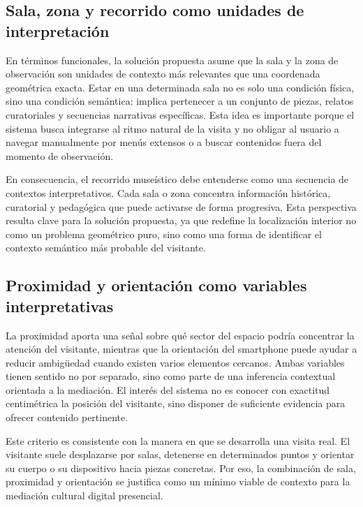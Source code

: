 \subsection{Sala, zona y recorrido como unidades de interpretaci\'on}

En t\'erminos funcionales, la solución propuesta asume que la sala y la zona de observaci\'on son unidades de contexto m\'as relevantes que una coordenada geom\'etrica exacta. Estar en una determinada sala no es solo una condici\'on f\'isica, sino una condici\'on sem\'antica: implica pertenecer a un conjunto de piezas, relatos curatoriales y secuencias narrativas espec\'ificas. Esta idea es importante porque el sistema busca integrarse al ritmo natural de la visita y no obligar al usuario a navegar manualmente por men\'us extensos o a buscar contenidos fuera del momento de observaci\'on.

En consecuencia, el recorrido muse\'istico debe entenderse como una secuencia de contextos interpretativos. Cada sala o zona concentra informaci\'on hist\'orica, curatorial y pedag\'ogica que puede activarse de forma progresiva. Esta perspectiva resulta clave para la solución propuesta, ya que redefine la localizaci\'on interior no como un problema geom\'etrico puro, sino como una forma de identificar el contexto sem\'antico m\'as probable del visitante.

\subsection{Proximidad y orientaci\'on como variables interpretativas}

La proximidad aporta una se\~nal sobre qu\'e sector del espacio podr\'ia concentrar la atenci\'on del visitante, mientras que la orientaci\'on del smartphone puede ayudar a reducir ambig\"uedad cuando existen varios elementos cercanos. Ambas variables tienen sentido no por separado, sino como parte de una inferencia contextual orientada a la mediaci\'on. El inter\'es del sistema no es conocer con exactitud centim\'etrica la posici\'on del visitante, sino disponer de suficiente evidencia para ofrecer contenido pertinente.

Este criterio es consistente con la manera en que se desarrolla una visita real. El visitante suele desplazarse por salas, detenerse en determinados puntos y orientar su cuerpo o su dispositivo hacia piezas concretas. Por eso, la combinaci\'on de sala, proximidad y orientaci\'on se justifica como un m\'inimo viable de contexto para la mediaci\'on cultural digital presencial.

